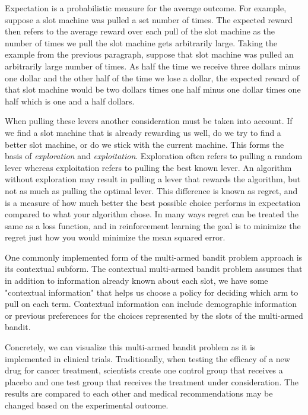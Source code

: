\documentclass{article}
\begin{document}
Expectation is a probabilistic measure for the average outcome. For example, suppose a slot machine was pulled a set number of times. The expected reward then refers to the average reward over each pull of the slot machine as the number of times we pull the slot machine gets arbitrarily large. Taking the example from the previous paragraph, suppose that slot machine was pulled an arbitrarily large number of times. As half the time we receive three dollars minus one dollar and the other half of the time we lose a dollar, the expected reward of that slot machine would be two dollars times one half minus one dollar times one half which is one and a half dollars.

When pulling these levers another consideration must be taken into account. If we find a slot machine that is already rewarding us well, do we try to find a better slot machine, or do we stick with the current machine. This forms the basis of \textit{exploration} and \textit{exploitation}. Exploration often refers to pulling a random lever whereas exploitation refers to pulling the best known lever. An algorithm without exploration may result in pulling a lever that rewards the algorithm, but not as much as pulling the optimal lever. This difference is known as regret, and is a measure of how much better the best possible choice performs in expectation compared to what your algorithm chose. In many ways regret can be treated the same as a loss function, and in reinforcement learning the goal is to minimize the regret just how you would minimize the mean squared error. 

One commonly implemented form of the multi-armed bandit problem approach is its contextual subform. The contextual multi-armed bandit problem assumes that in addition to information already known about each slot, we have some "contextual information" that helps us choose a policy for deciding which arm to pull on each term. Contextual information can include demographic information or previous preferences for the choices represented by the slots of the multi-armed bandit.

Concretely, we can visualize this multi-armed bandit problem as it is implemented in clinical trials. Traditionally, when testing the efficacy of a new drug for cancer treatment, scientists create one control group that receives a placebo and one test group that receives the treatment under consideration. The results are compared to each other and medical recommendations may be changed based on the experimental outcome.
\end{document}
